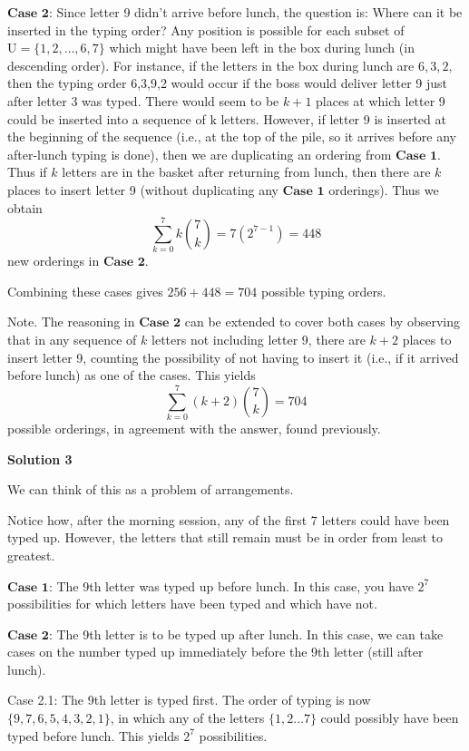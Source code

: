 \begin{enumerate}
 $\textbf{Case 2:}$ Since letter 9 didn't arrive before lunch, the question is: Where can it be inserted in the typing order? Any position is possible for each subset of $\mathrm{U}=\{1,2, \ldots, 6,7\}$ which might have been left in the box during lunch (in descending order). For instance, if the letters in the box during lunch are $6,3,2,$ then the typing order 6,3,9,2 would occur if the boss would deliver letter 9 just after letter 3 was typed. There would seem to be $k+1$ places at which letter 9 could be inserted into a sequence of $\mathrm{k}$ letters. However, if letter 9 is inserted at the beginning of the sequence (i.e., at the top of the pile, so it arrives before any after-lunch typing is done), then we are duplicating an ordering from $\textbf{Case 1}$. Thus if $k$ letters are in the basket after returning from lunch, then there are $k$ places to insert letter 9 (without duplicating any $\textbf{Case 1}$ orderings). Thus we obtain
 \[\sum_{k=0}^{7} k\binom 7k=7\left(2^{7-1}\right)=448\]new orderings in $\textbf{Case 2}$.

 
Combining these cases gives $256+448=704$ possible typing orders.

 
Note. The reasoning in $\textbf{Case 2}$ can be extended to cover both cases by observing that in any sequence of $k$ letters not including letter 9, there are $k+2$ places to insert letter 9, counting the possibility of not having to insert it (i.e., if it arrived before lunch) as one of the cases. This yields
 \[\sum_{k=0}^{7}(k+2)\binom7k= \boxed{704}\]possible orderings, in agreement with the answer, found previously.

 



\textbf{Solution 3}

We can think of this as a problem of arrangements.

 Notice how, after the morning session, any of the first 7 letters could have been typed up. However, the letters that still remain must be in order from least to greatest.

 $\textbf{Case 1:}$ The 9th letter was typed up before lunch. In this case, you have $2^{7}$ possibilities for which letters have been typed and which have not.

 $\textbf{Case 2:}$ The 9th letter is to be typed up after lunch. In this case, we can take cases on the number typed up immediately before the 9th letter (still after lunch).

 Case 2.1: The 9th letter is typed first. The order of typing is now $\{9, 7, 6, 5, 4, 3, 2, 1\}$, in which any of the letters $\{1, 2\ldots7\}$ could possibly have been typed before lunch. This yields $2^7$ possibilities.


\end{enumerate}
